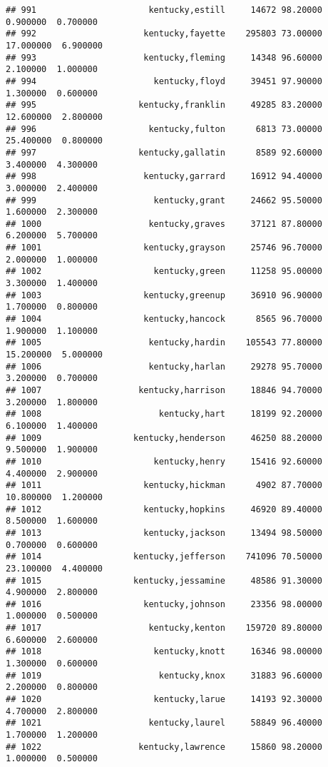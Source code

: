 \documentclass[
]{article}
\begin{document}
\begin{verbatim}
## 991                      kentucky,estill     14672 98.20000  0.900000  0.700000
## 992                     kentucky,fayette    295803 73.00000 17.000000  6.900000
## 993                     kentucky,fleming     14348 96.60000  2.100000  1.000000
## 994                       kentucky,floyd     39451 97.90000  1.300000  0.600000
## 995                    kentucky,franklin     49285 83.20000 12.600000  2.800000
## 996                      kentucky,fulton      6813 73.00000 25.400000  0.800000
## 997                    kentucky,gallatin      8589 92.60000  3.400000  4.300000
## 998                     kentucky,garrard     16912 94.40000  3.000000  2.400000
## 999                       kentucky,grant     24662 95.50000  1.600000  2.300000
## 1000                     kentucky,graves     37121 87.80000  6.200000  5.700000
## 1001                    kentucky,grayson     25746 96.70000  2.000000  1.000000
## 1002                      kentucky,green     11258 95.00000  3.300000  1.400000
## 1003                    kentucky,greenup     36910 96.90000  1.700000  0.800000
## 1004                    kentucky,hancock      8565 96.70000  1.900000  1.100000
## 1005                     kentucky,hardin    105543 77.80000 15.200000  5.000000
## 1006                     kentucky,harlan     29278 95.70000  3.200000  0.700000
## 1007                   kentucky,harrison     18846 94.70000  3.200000  1.800000
## 1008                       kentucky,hart     18199 92.20000  6.100000  1.400000
## 1009                  kentucky,henderson     46250 88.20000  9.500000  1.900000
## 1010                      kentucky,henry     15416 92.60000  4.400000  2.900000
## 1011                    kentucky,hickman      4902 87.70000 10.800000  1.200000
## 1012                    kentucky,hopkins     46920 89.40000  8.500000  1.600000
## 1013                    kentucky,jackson     13494 98.50000  0.700000  0.600000
## 1014                  kentucky,jefferson    741096 70.50000 23.100000  4.400000
## 1015                  kentucky,jessamine     48586 91.30000  4.900000  2.800000
## 1016                    kentucky,johnson     23356 98.00000  1.000000  0.500000
## 1017                     kentucky,kenton    159720 89.80000  6.600000  2.600000
## 1018                      kentucky,knott     16346 98.00000  1.300000  0.600000
## 1019                       kentucky,knox     31883 96.60000  2.200000  0.800000
## 1020                      kentucky,larue     14193 92.30000  4.700000  2.800000
## 1021                     kentucky,laurel     58849 96.40000  1.700000  1.200000
## 1022                   kentucky,lawrence     15860 98.20000  1.000000  0.500000

\end{verbatim}
\end{document}
